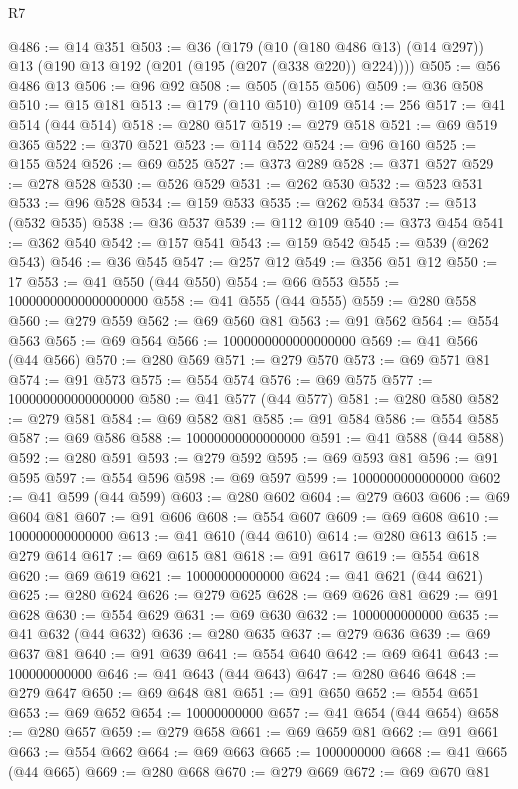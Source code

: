 \begin{lexlean}{R7}
\begin{coremodule}
@486 := @14 @351
@503 := @36
    (@179
      (@10 (@180 @486 @13) (@14 @297))
      @13
      (@190 @13 @192 (@201 (@195 (@207 (@338 @220)) @224))))
@505 := @56 @486 @13
@506 := @96 @92
@508 := @505 (@155 @506)
@509 := @36 @508
@510 := @15 @181
@513 := @179 (@110 @510) @109
@514 := 256
@517 := @41 @514 (@44 @514)
@518 := @280 @517
@519 := @279 @518
@521 := @69 @519 @365
@522 := @370 @521
@523 := @114 @522
@524 := @96 @160
@525 := @155 @524
@526 := @69 @525
@527 := @373 @289
@528 := @371 @527
@529 := @278 @528
@530 := @526 @529
@531 := @262 @530
@532 := @523 @531
@533 := @96 @528
@534 := @159 @533
@535 := @262 @534
@537 := @513 (@532 @535)
@538 := @36 @537
@539 := @112 @109
@540 := @373 @454
@541 := @362 @540
@542 := @157 @541
@543 := @159 @542
@545 := @539 (@262 @543)
@546 := @36 @545
@547 := @257 @12
@549 := @356 @51 @12
@550 := 17
@553 := @41 @550 (@44 @550)
@554 := @66 @553
@555 := 10000000000000000000
@558 := @41 @555 (@44 @555)
@559 := @280 @558
@560 := @279 @559
@562 := @69 @560 @81
@563 := @91 @562
@564 := @554 @563
@565 := @69 @564
@566 := 1000000000000000000
@569 := @41 @566 (@44 @566)
@570 := @280 @569
@571 := @279 @570
@573 := @69 @571 @81
@574 := @91 @573
@575 := @554 @574
@576 := @69 @575
@577 := 100000000000000000
@580 := @41 @577 (@44 @577)
@581 := @280 @580
@582 := @279 @581
@584 := @69 @582 @81
@585 := @91 @584
@586 := @554 @585
@587 := @69 @586
@588 := 10000000000000000
@591 := @41 @588 (@44 @588)
@592 := @280 @591
@593 := @279 @592
@595 := @69 @593 @81
@596 := @91 @595
@597 := @554 @596
@598 := @69 @597
@599 := 1000000000000000
@602 := @41 @599 (@44 @599)
@603 := @280 @602
@604 := @279 @603
@606 := @69 @604 @81
@607 := @91 @606
@608 := @554 @607
@609 := @69 @608
@610 := 100000000000000
@613 := @41 @610 (@44 @610)
@614 := @280 @613
@615 := @279 @614
@617 := @69 @615 @81
@618 := @91 @617
@619 := @554 @618
@620 := @69 @619
@621 := 10000000000000
@624 := @41 @621 (@44 @621)
@625 := @280 @624
@626 := @279 @625
@628 := @69 @626 @81
@629 := @91 @628
@630 := @554 @629
@631 := @69 @630
@632 := 1000000000000
@635 := @41 @632 (@44 @632)
@636 := @280 @635
@637 := @279 @636
@639 := @69 @637 @81
@640 := @91 @639
@641 := @554 @640
@642 := @69 @641
@643 := 100000000000
@646 := @41 @643 (@44 @643)
@647 := @280 @646
@648 := @279 @647
@650 := @69 @648 @81
@651 := @91 @650
@652 := @554 @651
@653 := @69 @652
@654 := 10000000000
@657 := @41 @654 (@44 @654)
@658 := @280 @657
@659 := @279 @658
@661 := @69 @659 @81
@662 := @91 @661
@663 := @554 @662
@664 := @69 @663
@665 := 1000000000
@668 := @41 @665 (@44 @665)
@669 := @280 @668
@670 := @279 @669
@672 := @69 @670 @81

\end{coremodule}
\end{lexlean}
